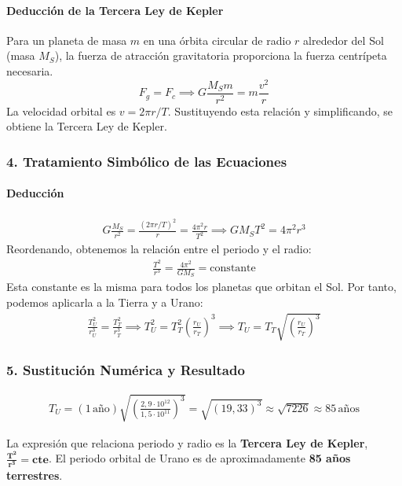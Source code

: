\paragraph{Deducción de la Tercera Ley de Kepler}
Para un planeta de masa $m$ en una órbita circular de radio $r$ alrededor del Sol (masa $M_S$), la fuerza de atracción gravitatoria proporciona la fuerza centrípeta necesaria.
$$ F_g = F_c \implies G\frac{M_S m}{r^2} = m \frac{v^2}{r} $$
La velocidad orbital es $v = 2\pi r/T$. Sustituyendo esta relación y simplificando, se obtiene la Tercera Ley de Kepler.

\subsubsection*{4. Tratamiento Simbólico de las Ecuaciones}
\paragraph{Deducción}
\begin{gather}
    G\frac{M_S}{r^2} = \frac{(2\pi r/T)^2}{r} = \frac{4\pi^2 r}{T^2} \implies G M_S T^2 = 4\pi^2 r^3
\end{gather}
Reordenando, obtenemos la relación entre el periodo y el radio:
\begin{gather}
    \frac{T^2}{r^3} = \frac{4\pi^2}{G M_S} = \text{constante}
\end{gather}
Esta constante es la misma para todos los planetas que orbitan el Sol. Por tanto, podemos aplicarla a la Tierra y a Urano:
\begin{gather}
    \frac{T_U^2}{r_U^3} = \frac{T_T^2}{r_T^3} \implies T_U^2 = T_T^2 \left(\frac{r_U}{r_T}\right)^3 \implies T_U = T_T \sqrt{\left(\frac{r_U}{r_T}\right)^3}
\end{gather}
\subsubsection*{5. Sustitución Numérica y Resultado}
\begin{gather}
    T_U = (1\,\text{año}) \sqrt{\left(\frac{2,9\cdot10^{12}}{1,5\cdot10^{11}}\right)^3} = \sqrt{(19,33)^3} \approx \sqrt{7226} \approx 85\,\text{años}
\end{gather}
\begin{cajaresultado}
    La expresión que relaciona periodo y radio es la \textbf{Tercera Ley de Kepler}, $\boldsymbol{\frac{T^2}{r^3} = \text{cte}}$. El periodo orbital de Urano es de aproximadamente \textbf{85 años terrestres}.
\end{cajaresultado}
